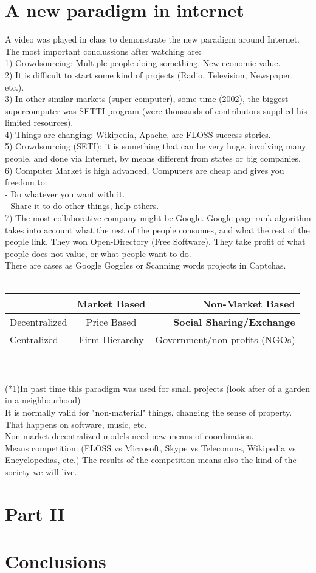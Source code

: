 \section{A new paradigm in internet}\label{MARKET_FLOSS} 

A video was played in class to demonstrate the new paradigm around Internet. The most important conclussions after watching are:\\
1) Crowdsourcing: Multiple people doing something. New economic value.\\ 
2) It is difficult to start some kind of projects (Radio, Television, Newspaper, etc.).\\ 
3) In other similar markets (super-computer), some time (2002), the biggest supercomputer was SETTI program (were thousands of contributors supplied his limited resources).\\
4) Things are changing: Wikipedia, Apache, are FLOSS success stories.\\
5) Crowdsourcing (SETI): it is something that can be very huge, involving many people, and done via Internet, by means different from states or big companies.\\
6) Computer Market is high advanced, Computers are cheap and gives you freedom to:\\
- Do whatever you want with it.\\
- Share it to do other things, help others.\\
7) The most collaborative company might be Google. Google page rank algorithm takes into account what the rest of the people consumes, and what the rest of the people link. They won Open-Directory (Free Software). They take profit of what people does not value, or what people want to do.\\
There are cases as Google Goggles or Scanning words projects in Captchas.\\
\\
\begin{tabular}{| l | c | r |}
   \hline
   & Market Based & Non-Market Based \\
   \hline
   Decentralized  & Price Based    & \textbf{Social Sharing/Exchange} \\
   \hline
   Centralized    & Firm Hierarchy & Government/non profits (NGOs) \\
   \hline
\end{tabular}
\\
\\
(*1)In past time this paradigm was used for small projects (look after of a garden in a neighbourhood)\\
It is normally valid for "non-material" things, changing the sense of property. That happens on software, music, etc.\\
Non-market decentralized models need new means of coordination.\\
Means competition: (FLOSS vs Microsoft, Skype vs Telecomms, Wikipedia vs Encyclopedias, etc.)
The results of the competition means also the kind of the society we will live.

\section{Part II}\label{Part II} %

\section{Conclusions}\label{conclusions}
 
